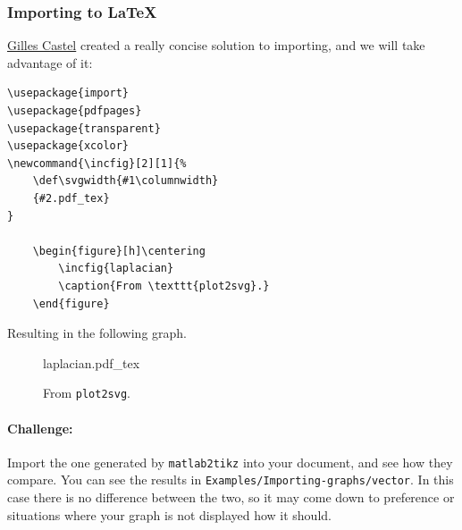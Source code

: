 \subsubsection{Importing to \LaTeX}
\href{https://github.com/gillescastel/}{Gilles Castel} created a really concise solution to importing, and we will take advantage of it:

\begin{lstlisting}
\usepackage{import}
\usepackage{pdfpages}
\usepackage{transparent}
\usepackage{xcolor}
\newcommand{\incfig}[2][1]{%
    \def\svgwidth{#1\columnwidth}
    {#2.pdf_tex}
}

    \begin{figure}[h]\centering
        \incfig{laplacian}
        \caption{From \texttt{plot2svg}.}
    \end{figure}

\end{lstlisting}

Resulting in the following graph.
\begin{figure}[h]\centering
    \def\svgwidth{0.8\columnwidth}
    {laplacian.pdf_tex}
    \caption{From \texttt{plot2svg}.}
\end{figure}

\paragraph{Challenge:}
Import the one generated by \texttt{matlab2tikz} into your document, and see how they compare.
You can see the results in \texttt{Examples/Importing-graphs/vector}.
In this case there is no difference between the two, so it may come down to preference or situations where your graph is not displayed how it should.